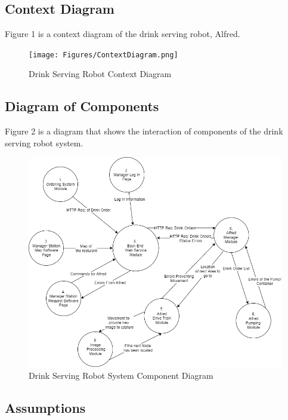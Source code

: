 \documentclass [10pt]{article}
\begin{document}
\subsection{Context Diagram}
Figure 1 is a context diagram of the drink serving robot, Alfred.
\begin{figure} [h!]
	\centering
	\texttt{[image: Figures/ContextDiagram.png]}
	\caption{Drink Serving Robot Context Diagram}
\end{figure}


\subsection{Diagram of Components}
Figure 2 is a diagram that shows the interaction of components of the drink serving robot system.
\begin{figure} [h!]
	\centering
	\includegraphics [scale = 0.6] {Figures/SystemComponents.png}
	\caption{Drink Serving Robot System Component Diagram}
\end{figure}


\subsection{Assumptions}
\end{document}
